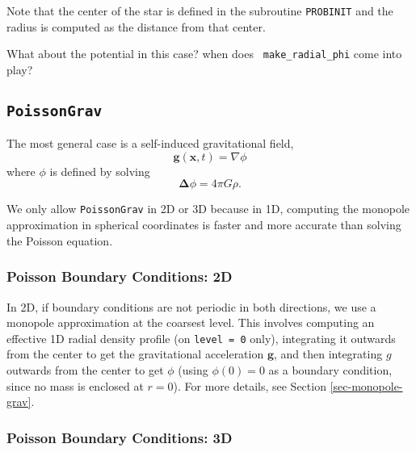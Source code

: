 \begin{itemize}
Note that the center of the star is defined in the subroutine {\tt PROBINIT}
and the radius is computed as the distance from that center.


\end{itemize}


{\color{red} What about the potential in this case? when does {\tt
    make\_radial\_phi} come into play?}


\subsection{{\tt PoissonGrav}}

The most general case is a self-induced gravitational field,
\begin{equation}
\mathbf{g}(\mathbf{x},t) = \nabla \phi
\end{equation}
where $\phi$ is defined by solving
\begin{equation}
\mathbf{\Delta} \phi = 4 \pi G \rho .\label{eq:Self Gravity}
\end{equation}

We only allow {\tt PoissonGrav} in 2D or 3D because in 1D, computing
the monopole approximation in spherical coordinates is faster and more
accurate than solving the Poisson equation.

\subsubsection{Poisson Boundary Conditions: 2D}

In 2D, if boundary conditions are not periodic in both directions, we
use a monopole approximation at the coarsest level. This involves
computing an effective 1D radial density profile (on {\tt level =
  0} only), integrating it outwards from the center to get the
gravitational acceleration $\mathbf{g}$, and then integrating $g$
outwards from the center to get $\phi$ (using $\phi(0) = 0$ as a
boundary condition, since no mass is enclosed at $r = 0$). For more
details, see Section \ref{sec-monopole-grav}.

\subsubsection{Poisson Boundary Conditions: 3D}\label{sec-poisson-3d-bcs}

